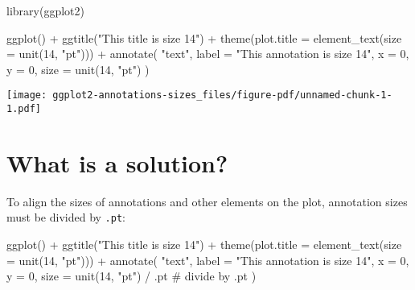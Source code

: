 \documentclass[
  letterpaper,
  DIV=11,
  numbers=noendperiod]{scrreprt}
\newenvironment{Shaded}{\begin{snugshade}}{\end{snugshade}}
\newcommand{\AttributeTok}[1]{\textcolor[rgb]{0.40,0.45,0.13}{#1}}
\newcommand{\CommentTok}[1]{\textcolor[rgb]{0.37,0.37,0.37}{#1}}
\newcommand{\DecValTok}[1]{\textcolor[rgb]{0.68,0.00,0.00}{#1}}
\newcommand{\FunctionTok}[1]{\textcolor[rgb]{0.28,0.35,0.67}{#1}}
\newcommand{\NormalTok}[1]{\textcolor[rgb]{0.00,0.23,0.31}{#1}}
\newcommand{\SpecialCharTok}[1]{\textcolor[rgb]{0.37,0.37,0.37}{#1}}
\newcommand{\StringTok}[1]{\textcolor[rgb]{0.13,0.47,0.30}{#1}}
\begin{document}
\begin{Shaded}
\begin{Highlighting}[]
\FunctionTok{library}\NormalTok{(ggplot2)}

\FunctionTok{ggplot}\NormalTok{() }\SpecialCharTok{+}
  \FunctionTok{ggtitle}\NormalTok{(}\StringTok{"This title is size 14"}\NormalTok{) }\SpecialCharTok{+}
  \FunctionTok{theme}\NormalTok{(}\AttributeTok{plot.title =} \FunctionTok{element\_text}\NormalTok{(}\AttributeTok{size =} \FunctionTok{unit}\NormalTok{(}\DecValTok{14}\NormalTok{, }\StringTok{"pt"}\NormalTok{))) }\SpecialCharTok{+}
  \FunctionTok{annotate}\NormalTok{(}
    \StringTok{"text"}\NormalTok{,}
    \AttributeTok{label =} \StringTok{"This annotation is size 14"}\NormalTok{,}
    \AttributeTok{x =} \DecValTok{0}\NormalTok{, }\AttributeTok{y =} \DecValTok{0}\NormalTok{,}
    \AttributeTok{size =} \FunctionTok{unit}\NormalTok{(}\DecValTok{14}\NormalTok{, }\StringTok{"pt"}\NormalTok{)}
\NormalTok{  )}
\end{Highlighting}
\end{Shaded}

\texttt{[image: ggplot2-annotations-sizes\_files/figure-pdf/unnamed-chunk-1-1.pdf]}

\section{What is a solution?}\label{what-is-a-solution}

To align the sizes of annotations and other elements on the plot,
annotation sizes must be divided by \texttt{.pt}:

\begin{Shaded}
\begin{Highlighting}[]
\FunctionTok{ggplot}\NormalTok{() }\SpecialCharTok{+}
  \FunctionTok{ggtitle}\NormalTok{(}\StringTok{"This title is size 14"}\NormalTok{) }\SpecialCharTok{+}
  \FunctionTok{theme}\NormalTok{(}\AttributeTok{plot.title =} \FunctionTok{element\_text}\NormalTok{(}\AttributeTok{size =} \FunctionTok{unit}\NormalTok{(}\DecValTok{14}\NormalTok{, }\StringTok{"pt"}\NormalTok{))) }\SpecialCharTok{+}
  \FunctionTok{annotate}\NormalTok{(}
    \StringTok{"text"}\NormalTok{,}
    \AttributeTok{label =} \StringTok{"This annotation is size 14"}\NormalTok{,}
    \AttributeTok{x =} \DecValTok{0}\NormalTok{, }\AttributeTok{y =} \DecValTok{0}\NormalTok{,}
    \AttributeTok{size =} \FunctionTok{unit}\NormalTok{(}\DecValTok{14}\NormalTok{, }\StringTok{"pt"}\NormalTok{) }\SpecialCharTok{/}\NormalTok{ .pt }\CommentTok{\# divide by .pt}
\NormalTok{  )}
\end{Highlighting}
\end{Shaded}
\end{document}
